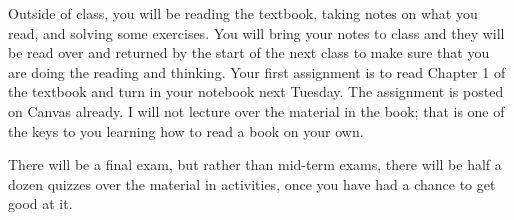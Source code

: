 Outside of class, you will be reading the textbook, taking notes on what you read, and solving some exercises.
You will bring your notes to class and they will be read over and returned by the start of the next class to make sure that you are doing the reading and thinking.
Your first assignment is to read Chapter 1 of the textbook and turn in your notebook next Tuesday.
The assignment is posted on Canvas already.
I will not lecture over the material in the book; that is one of the keys to you learning how to read a book on your own.
\vskip 0.1in

There will be a final exam, but rather than mid-term exams, there will be half a dozen quizzes over the material in activities, once you have had a chance to get good at it.
